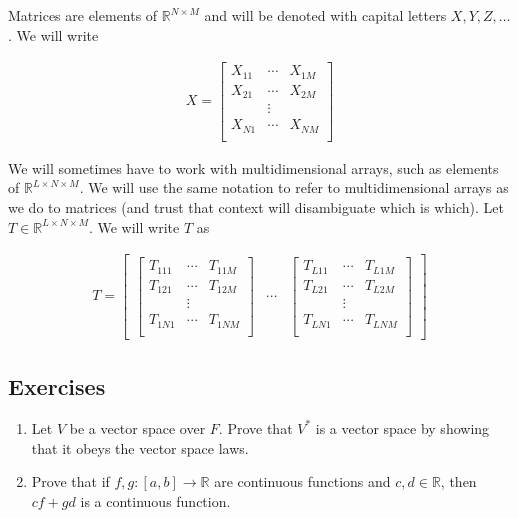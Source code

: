 \documentclass[book.tex]{subfiles}
\begin{document}
Matrices are elements of $\mathbb{R}^{N \times M}$ and will be denoted with capital letters $X, Y, Z, \dotsc$. We will write

\begin{align}
    X = \begin{bmatrix}
    X_{11} & \cdots & X_{1M} \\
    X_{21} & \cdots & X_{2M} \\
           & \vdots & \\
    X_{N1}&  \cdots& X_{NM} \\
    \end{bmatrix}
\end{align}

We will sometimes have to work with multidimensional arrays, such as elements of $\mathbb{R}^{L \times N \times M}$. We will use the same notation to refer to multidimensional arrays as we do to matrices (and trust that context will disambiguate which is which). Let $T \in \mathbb{R}^{L \times N \times M }$. We will write $T$ as 

\begin{align}
T = \begin{bmatrix}
    \begin{bmatrix}
    T_{111} &\cdots  & T_{11M} \\
    T_{121} & \cdots & T_{12M} \\
            & \vdots & \\
    T_{1N1} & \cdots & T_{1NM} \\
    \end{bmatrix}
    & \cdots &
    \begin{bmatrix}
    T_{L11} & \cdots & T_{L1M} \\
    T_{L21} & \cdots & T_{L2M} \\
            & \vdots & \\
    T_{LN1} & \cdots & T_{LNM} \\
    \end{bmatrix}
    \end{bmatrix}
\end{align}

\subsection{Exercises}
\begin{enumerate}
    \item Let $V$ be a vector space over $F$. Prove that $V^*$ is a vector space by showing that it obeys the vector space laws.
    \item Prove that if $f,g :[a, b] \to \mathbb{R}$ are continuous functions and $c, d \in \mathbb{R}$, then $cf + gd$ is a continuous function.
\end{enumerate}
\end{document}
